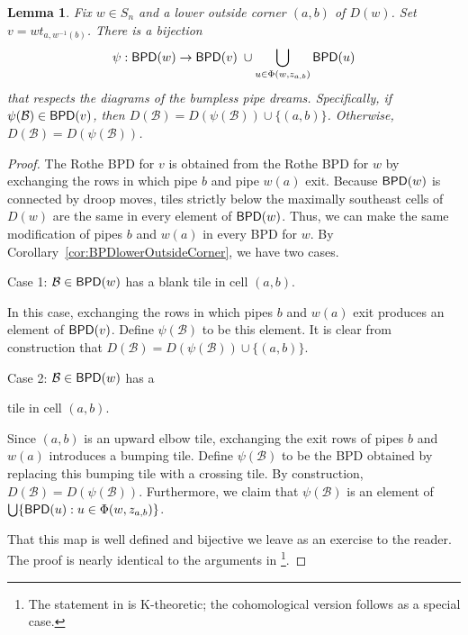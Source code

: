 \documentclass[12pt,reqno]{amsart}
\newtheorem{lemma}[theorem]{Lemma}
\newtheorem{Main Conjecture}[theorem]{Main Conjecture}
\theoremstyle{remark}
\theoremstyle{plain}
\newcommand{\bpd}{{\sf BPD}}
\begin{document}
 
\begin{lemma}\label{lem:bpdBij}
 Fix $w \in S_n$ and a lower outside corner $(a,b)$ of $D(w)$.   
Set $v = wt_{a, w^{-1}(b)}$.  There is a bijection 
\[\psi:\displaystyle \bpd(w) \rightarrow \bpd(v) \hspace{1mm} \cup   \bigcup_{u \in \Phi(w, z_{a,b})} \bpd(u)\]
that respects the diagrams of the bumpless pipe dreams.  Specifically, if $\psi(\mathcal B)\in \bpd(v)$, then $D(\mathcal B)=D(\psi(\mathcal B))\cup \{(a,b)\}$.  Otherwise, $D(\mathcal B)=D(\psi(\mathcal B))$.
\end{lemma}
\begin{proof}
The Rothe BPD for $v$ is obtained from the Rothe BPD for $w$ by exchanging the rows in which pipe $b$ and pipe $w(a)$ exit.  
Because $\bpd(w)$ is connected by droop moves, tiles strictly below the maximally southeast
cells of $D(w)$ are the same in every element of $\bpd(w)$.  Thus, we can make the same modification of pipes $b$ and $w(a)$ in every BPD for $w$.  By Corollary~\ref{cor:BPDlowerOutsideCorner}, we have two cases.

\noindent Case 1: $\mathcal B\in \bpd(w)$ has a blank tile in cell $(a,b)$.

In this case, exchanging the rows in which pipes $b$ and $w(a)$ exit produces an element of $\bpd(v)$.  Define $\psi(\mathcal B)$ to be this element. It is clear from construction that $D(\mathcal B)=D(\psi(\mathcal B))\cup\{(a,b)\}.$

\noindent Case 2: $\mathcal B\in \bpd(w)$ has a  tile in cell $(a,b)$.

Since $(a,b)$ is an upward elbow tile, exchanging the exit rows of pipes $b$ and $w(a)$ introduces a bumping tile.  Define $\psi(\mathcal B)$ to be the BPD obtained by replacing this bumping tile with a crossing tile.  By construction, $D(\mathcal B)=D(\psi(\mathcal B))$.  Furthermore, 
we claim that
$\psi(\mathcal B)$ is an element of 
$ \bigcup\{ \bpd(u):u \in \Phi(w,z_{a,b})\}$.
		
That this map is well defined and bijective we leave as an exercise to the reader.  
The proof is nearly identical to the  arguments in \cite[Section~5]{Wei21}\footnote{The statement in \cite[Section~5]{Wei21} is K-theoretic; the cohomological version follows as a special case.}. 
 \end{proof}
 
\end{document}
